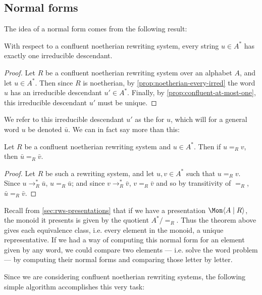 \documentclass[noindex,noinsetproof,12pt]{lmaths}
\begin{document}
\subsection{Normal forms} \label{sec:normal-forms}

The idea of a normal form comes from the following result:

\begin{prop}
	With respect to a confluent noetherian rewriting system, every string $u \in A^*$ has exactly one irreducible descendant.
\end{prop}
\begin{proof}
	Let $R$ be a confluent noetherian rewriting system over an alphabet $A$, and let $u \in A^*$. Then since $R$ is noetherian, by \cref{prop:noetherian-every-irred} the word $u$ has an irreducible descendant $u' \in A^*$. Finally, by \cref{prop:confluent-at-most-one}, this irreducible descendant $u'$ must be unique.
\end{proof}

We refer to this irreducible descendant $u'$ as the  for $u$, which will for a general word $u$ be denoted $\bar u$. We can in fact say more than this:

\begin{theorem}
	Let $R$ be a confluent noetherian rewriting system and $u \in A^*$. Then if $u =_R v$, then $\bar u =_R \bar v$.
\end{theorem}
\begin{proof}
	Let $R$ be such a rewriting system, and let $u, v \in A^*$ such that $u =_R v$. Since $u \to_R^* \bar u$, $u =_R \bar u$; and since $v \to_R^* \bar v$, $v =_R \bar v$ and so by transitivity of $=_R$, $\bar u =_R \bar v$.
\end{proof}

Recall from \cref{sec:rws-presentations} that if we have a presentation $\Mon \langle A \mid R \rangle$, the monoid it presents is given by the quotient $A^*/{=_R}$. Thus the theorem above gives each equivalence class, i.e. every element in the monoid, a unique representative. If we had a way of computing this normal form for an element given by any word, we could compare two elements --- i.e. solve the word problem --- by computing their normal forms and comparing those letter by letter.

Since we are considering confluent noetherian rewriting systems, the following simple algorithm accomplishes this very task:
\end{document}
